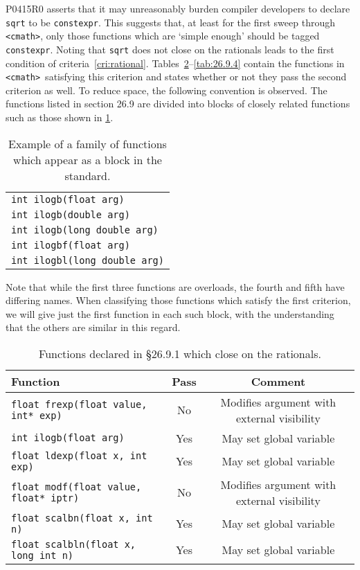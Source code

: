 \documentclass[prd,preprint,amsmath,amssymb,nofootinbib,eqsecnum]{revtex4-1}
\newcommand{\code}[1]{{\tt #1}}
\newcommand{\constexpr}{\code{constexpr}}
\newcommand{\header}[1]{{\tt <#1>}}
\newcommand{\cmath}{\header{cmath}}
\begin{document}
P0415R0 asserts that it may unreasonably burden compiler developers to declare \code{sqrt} to be \constexpr. This suggests that, at least for the first sweep through \cmath, only those functions which are `simple enough' should be tagged \constexpr. Noting that \code{sqrt} does not close on the rationals leads to the first condition of criteria~\ref{cri:rational}. Tables~\ref{tab:26.9.1}--\ref{tab:26.9.4} contain the functions in \cmath\ satisfying this criterion and states whether or not they pass the second criterion as well. To reduce space, the following convention is observed. The functions listed in section 26.9 are divided into blocks of closely related functions such as those shown in \ref{tab:example}. 
\begin{table}
	\begin{tabular}{l}
		\code{int ilogb(float arg)}
	\\
		\code{int ilogb(double arg)}
	\\
		\code{int ilogb(long double arg)}
	\\
		\code{int ilogbf(float arg)}
	\\
		\code{int ilogbl(long double arg)}
	\end{tabular}
\caption{Example of a family of functions which appear as a block in the standard.}
\label{tab:example}
\end{table}
Note that while the first three functions are overloads, the fourth and fifth have differing names.
When classifying those functions which satisfy the first criterion, we will give just the first function in each such block, with the understanding that the others are similar in this regard.

\begin{table}[h]
	\begin{tabular}{lcc}
		Function & Pass & Comment
	\\
	\hline \hline
		\code{float frexp(float value, int* exp)} & No & Modifies argument with external visibility
	\\
	\hline
		\code{int ilogb(float arg)} & Yes & May set global variable
	\\
	\hline
		\code{float ldexp(float x, int exp)} & Yes & May set global variable
	\\
	\hline
		\code{float modf(float value, float* iptr)} & No & Modifies argument with external visibility
	\\
	\hline
		\code {float scalbn(float x, int n)} & Yes & May set global variable
	\\
	\hline
		\code {float scalbln(float x, long int n)} & Yes & May set global variable
	\end{tabular}
\caption{Functions declared in \S 26.9.1 which close on the rationals.}
\label{tab:26.9.1}
\end{table}
\end{document}
